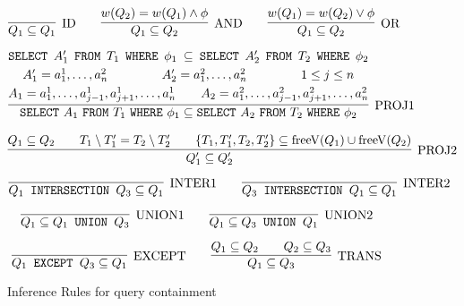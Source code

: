 \begin{figure}[!ht]
\[
\infer[\text{ID}]
	{Q_1 \subseteq Q_1}
	{}
\qquad	
\infer[\text{AND}]
	{Q_1 \subseteq Q_2}
	{w(Q_2) = w(Q_1) \land \phi}
\qquad
\infer[\text{OR}]
	{Q_1 \subseteq Q_2}
	{w(Q_1) = w(Q_2) \lor \phi}
\]


\begin{multline*}
\infer[\text{PROJ1}]
	{\texttt{SELECT}\ A_1\ \texttt{FROM}\ T_1\ \texttt{WHERE}\ \phi_1 \subseteq \texttt{SELECT}\ A_2\ \texttt{FROM}\ T_2\ \texttt{WHERE}\ \phi_2}
	{
	\texttt{SELECT}\ A_1'\ \texttt{FROM}\ T_1\ \texttt{WHERE}\ \phi_1 \subseteq \texttt{SELECT}\ A_2'\ \texttt{FROM}\ T_2\ \texttt{WHERE}\ \phi_2 \\
	\hfill A_1' = a_1^1, \ldots, a_n^2 \hfill \qquad
	\hfill A_2' = a_1^2, \ldots, a_n^2 \hfill \qquad
	\hfill 1 \leq j \leq n \hfill \\
	\hfill A_1 = a_1^1, \ldots, a_{j-1}^1, a_{j+1}^1, \ldots,  a_n^1 \hfill \qquad
	\hfill A_2 = a_1^2, \ldots, a_{j-1}^2, a_{j+1}^2, \ldots, a_n^2 \hfill 	
	}
\end{multline*}

\[
\infer[\text{PROJ2}]
	{Q_1' \subseteq Q_2'}
	{Q_1 \subseteq Q_2 \qquad T_1 \setminus T_1' = T_2 \setminus T_2'\qquad 
		\lbrace	T_1, T_1', T_2, T_2' \rbrace \subseteq \operatorname{freeV}(Q_1) \cup \operatorname{freeV}(Q_2)}
\]





\[
\infer[\text{INTER1}]
	{Q_1 \text{\texttt{ INTERSECTION }} Q_3 \subseteq Q_1}
	{}
\qquad
\infer[\text{INTER2}]
	{Q_3 \text{\texttt{ INTERSECTION }} Q_1 \subseteq Q_1}
	{}
\]

\[
\infer[\text{UNION1}]
	{Q_1 \subseteq Q_1 \text{\texttt{ UNION }} Q_3}
	{}
\qquad
\infer[\text{UNION2}]
	{Q_1 \subseteq Q_3 \text{\texttt{ UNION }} Q_1}
	{}
\]

\[
\infer[\text{EXCEPT}]
	{Q_1 \text{\texttt{ EXCEPT }} Q_3 \subseteq Q_1}
	{}
\qquad
\infer[\text{TRANS}]
	{Q_1 \subseteq Q_3}
	{Q_1 \subseteq Q_2 \qquad Q_2 \subseteq Q_3}
\]
\caption{Inference Rules for query containment}
\label{figure:algorithms:infrules}
\end{figure}


